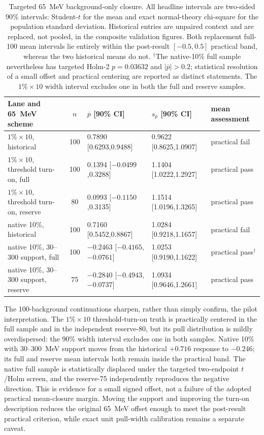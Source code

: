 \begin{table}[htbp]
\centering
\small
\begin{tabularx}{\textwidth}{P{0.27\textwidth}cP{0.20\textwidth}P{0.20\textwidth}Y}
\toprule
Lane and 65~MeV scheme & $n$ & $\overline p$ [90\% CI] & $s_p$ [90\% CI] & mean assessment \\
\midrule
$1\%\times10$, historical & 100 & 0.7890 [0.6293,0.9488] & 0.9622 [0.8625,1.0907] & practical fail \\
$1\%\times10$, threshold turn-on, full & 100 & 0.1394 [$-0.0499$,0.3288] & 1.1404 [1.0222,1.2927] & practical pass \\
$1\%\times10$, threshold turn-on, reserve & 80 & 0.0993 [$-0.1150$,0.3135] & 1.1514 [1.0196,1.3265] & practical pass \\
native 10\%, historical & 100 & 0.7160 [0.5452,0.8867] & 1.0284 [0.9218,1.1657] & practical fail \\
native 10\%, 30--300 support, full & 100 & $-0.2463$ [$-0.4165$,$-0.0761$] & 1.0253 [0.9190,1.1622] & practical pass$^\dagger$ \\
native 10\%, 30--300 support, reserve & 75 & $-0.2840$ [$-0.4943$,$-0.0737$] & 1.0934 [0.9646,1.2661] & practical pass \\
\bottomrule
\end{tabularx}
\caption{Targeted 65~MeV background-only closure.  All headline intervals are
two-sided 90\% intervals: Student-$t$ for the mean and exact normal-theory
chi-square for the population standard deviation.  Historical entries are unpaired
context and are replaced, not pooled, in the composite validation figures.  Both
replacement full-100 mean intervals lie entirely within the post-result
$[-0.5,0.5]$ practical band, whereas the two historical means do not.
$^\dagger$The native-10\% full sample nevertheless has targeted Holm-2
$p=0.03632$ and $|\overline p|>0.2$; statistical resolution of a small offset and
practical centering are reported as distinct statements.  The $1\%\times10$ width
interval excludes one in both the full and reserve samples.}
\label{tab:v491-sixtyfive-results}
\end{table}

The 100-background continuations sharpen, rather than simply confirm, the pilot
interpretation.  The $1\%\times10$ threshold-turn-on truth is practically centered
in the full sample and in the independent reserve-80, but its pull distribution is
mildly overdispersed: the 90\% width interval excludes one in both samples.  Native
10\% with 30--300~MeV support moves from the historical $+0.716$ response to
$-0.246$; its full and reserve mean intervals both remain inside the practical band.
The native full sample is statistically displaced under the targeted two-endpoint
$t$/Holm screen, and the reserve-75 independently reproduces the negative direction.
This is evidence for a small signed offset, not a failure of the adopted practical
mean-closure margin.  Moving the support and improving the turn-on description reduces
the original 65~MeV offset enough to meet the post-result practical criterion, while
exact unit pull-width calibration remains a separate caveat.

